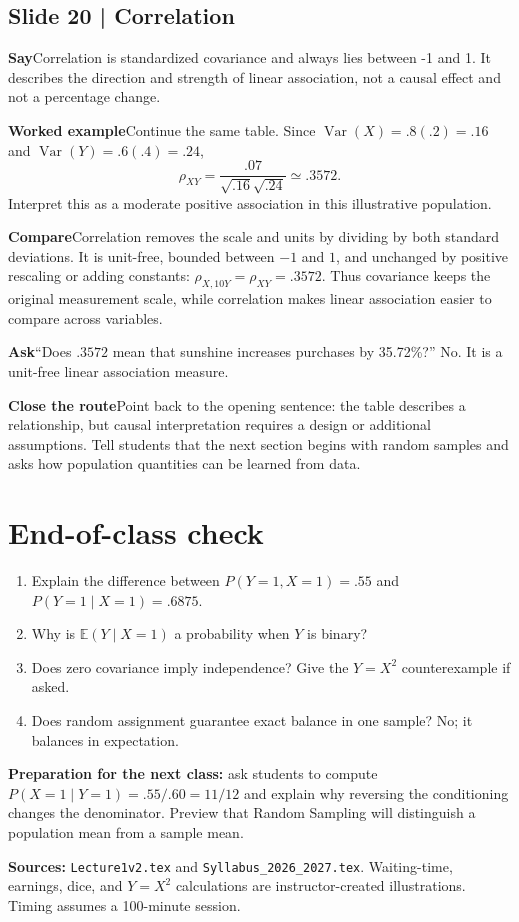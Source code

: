 \documentclass[11pt,a4paper]{article}
\newcommand{\heading}[1]{\section*{\color{accent}#1}}
\newcommand{\slideheading}[1]{\subsection*{\color{accent}#1}}
\newcommand{\cue}[2]{\par\noindent\textbf{#1}\quad #2\par}
\newcommand{\E}{\mathbb{E}}
\newcommand{\Var}{\operatorname{Var}}
\begin{document}
\slideheading{Slide 20 | Correlation}
\cue{Say}{Correlation is standardized covariance and always lies between -1 and 1. It describes the direction and strength of linear association, not a causal effect and not a percentage change.}
\cue{Worked example}{Continue the same table. Since $\Var(X)=.8(.2)=.16$ and $\Var(Y)=.6(.4)=.24$, \[\rho_{XY}=\frac{.07}{\sqrt{.16}\sqrt{.24}}\simeq .3572.\] Interpret this as a moderate positive association in this illustrative population.}
\cue{Compare}{Correlation removes the scale and units by dividing by both standard deviations. It is unit-free, bounded between $-1$ and $1$, and unchanged by positive rescaling or adding constants: $\rho_{X,10Y}=\rho_{XY}=.3572$. Thus covariance keeps the original measurement scale, while correlation makes linear association easier to compare across variables.}
\cue{Ask}{``Does $.3572$ mean that sunshine increases purchases by 35.72\%?'' No. It is a unit-free linear association measure.}
\cue{Close the route}{Point back to the opening sentence: the table describes a relationship, but causal interpretation requires a design or additional assumptions. Tell students that the next section begins with random samples and asks how population quantities can be learned from data.}

\heading{End-of-class check}
\begin{enumerate}
\item Explain the difference between $P(Y=1,X=1)=.55$ and $P(Y=1\mid X=1)=.6875$.
\item Why is $\E(Y\mid X=1)$ a probability when $Y$ is binary?
\item Does zero covariance imply independence? Give the $Y=X^2$ counterexample if asked.
\item Does random assignment guarantee exact balance in one sample? No; it balances in expectation.
\end{enumerate}

\textbf{Preparation for the next class:} ask students to compute $P(X=1\mid Y=1)=.55/.60=11/12$ and explain why reversing the conditioning changes the denominator. Preview that Random Sampling will distinguish a population mean from a sample mean.

\textbf{Sources:} \texttt{Lecture1v2.tex} and \texttt{Syllabus\_2026\_2027.tex}. Waiting-time, earnings, dice, and $Y=X^2$ calculations are instructor-created illustrations. Timing assumes a 100-minute session.
\end{document}
